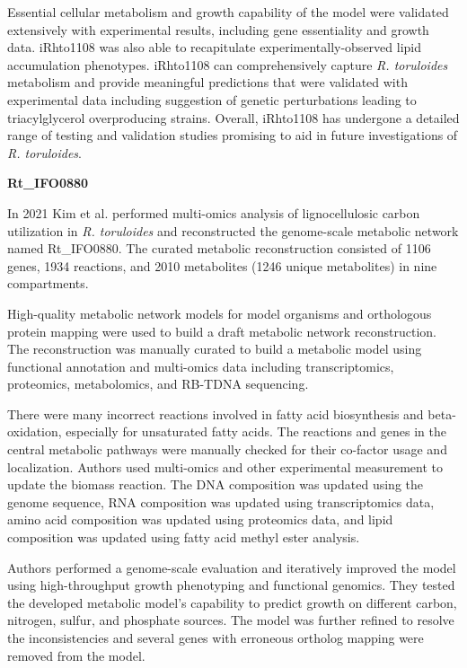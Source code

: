 Essential cellular metabolism and growth
capability of the model were validated extensively with experimental
results, including gene essentiality \cite{Coradetti2018} and growth
data. iRhto1108 was also able to recapitulate experimentally-observed
lipid accumulation phenotypes. iRhto1108 can comprehensively capture \textit{R. toruloides} metabolism and provide meaningful predictions that
were validated with experimental data including suggestion of genetic
perturbations leading to triacylglycerol overproducing strains. Overall, iRhto1108 has undergone a
detailed range of testing and validation studies promising to aid in future
investigations of \textit{R. toruloides}. \cite{Dinh2019}


\textbf{Rt\_IFO0880}

In 2021 Kim et al. performed multi-omics analysis of lignocellulosic carbon utilization in \textit{R. toruloides} and reconstructed
the genome-scale metabolic network named Rt\_IFO0880. The
curated metabolic reconstruction consisted of 1106 genes, 1934
reactions, and 2010 metabolites (1246 unique metabolites) in
nine compartments. \cite{Kim2021}

High-quality metabolic network
models for model organisms and orthologous protein mapping were used to build a
draft metabolic network reconstruction. The reconstruction was manually curated to
build a metabolic model using functional annotation and multi-omics data including
transcriptomics, proteomics, metabolomics, and RB-TDNA sequencing. \cite{Kim2021}

There were many incorrect reactions involved in fatty acid
biosynthesis and beta-oxidation, especially for unsaturated fatty
acids. The reactions and genes in the central metabolic pathways
were manually checked for their co-factor usage and localization. Authors used multi-omics and other experimental measurement
to update the biomass reaction. The DNA composition was
updated using the genome sequence, RNA composition was
updated using transcriptomics data, amino acid composition
was updated using proteomics data, and lipid composition
was updated using fatty acid methyl ester analysis. \cite{Kim2021}
 
Authors performed a genome-scale evaluation and iteratively
improved the model using high-throughput growth phenotyping
and functional genomics. They tested the developed metabolic model's capability to predict
growth on different carbon, nitrogen, sulfur, and phosphate
sources. The model was further refined to resolve the inconsistencies and several genes
with erroneous ortholog mapping were removed from the
model. \cite{Kim2021}

